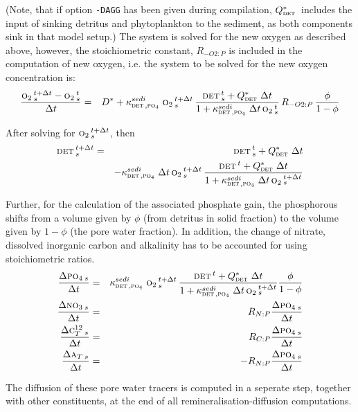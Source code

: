 \documentclass[11pt,a4paper,fleqn,twoside]{article}
\def\pho{\text{\textsc{po$_4$}}\,}
\def\nit{\text{\textsc{no$_3$}}\,}
\def\car{\text{\textsc{c$_T^{12}$}}\,}
\def\oxy{\text{\textsc{o$_2$}}\,}
\def\alk{\text{\textsc{a$_T$}}\,}
\def\det{\text{\textsc{det}}\,}
\begin{document}
 (Note, that if option {\tt -DAGG} has been given during compilation, $Q^*_\det$
includes the input of sinking detritus and phytoplankton to the sediment, as
both components sink in that model setup.)
The system is solved for the new oxygen as described above, however, 
the stoichiometric constant, $R_{-O2:P}$ is included in the computation of new
oxygen, i.e. the system to be solved for the new oxygen concentration is:
\begin{eqnarray}
\frac{\oxy^{t+\Delta t}_s-\oxy^{t}_s}{\Delta t} & = & 
D^* + \kappa^{sedi}_{\det,\pho} \, \oxy^{t+\Delta t}_s \, 
\frac{ \det^{t}_s + Q^*_\det \, \Delta t} {1+ \kappa^{sedi}_{\det,\pho} \,  \Delta t \,
\oxy^t_s } \, R_{-O2:P} \, \frac{\phi}{1-\phi} 
\end{eqnarray}

After solving for $\oxy^{t+\Delta t}_s$, then  
\begin{eqnarray}
\det^{t+\Delta t}_s & = & \det^t_s + Q^*_\det \, \Delta t \\
&& -\kappa^{sedi}_{\det,\pho} \, \Delta t \, \oxy^{t+\Delta t}_s \, 
\frac{ \det^{t} + Q^*_\det \, \Delta t} {1+ \kappa^{sedi}_{\det,\pho} \,  \Delta t \,
\oxy^{t + \Delta t}_s} \nonumber 
\end{eqnarray}


Further, for the calculation of the associated phosphate gain, the phosphorous
shifts from a volume given by $\phi$  (from detritus in solid fraction)
to the volume given by $1-\phi$ (the pore water fraction). In addition, the change of nitrate, dissolved inorganic carbon and alkalinity
has to be accounted for using stoichiometric ratios.
\begin{eqnarray}
\frac{\Delta \pho_s}{\Delta t} & = &  \kappa^{sedi}_{\det,\pho} \, \oxy^{t+\Delta t}_s \, 
\frac{ \det^{t} + Q^*_\det \, \Delta t} {1+ \kappa^{sedi}_{\det,\pho} \,  \Delta t \,
\oxy^{t + \Delta t}_s}\frac{\phi}{1-\phi}\label{dglpho}\\
\frac{\Delta \nit_s}{\Delta t} & = & R_{N:P} \frac{\Delta \pho_s} {\Delta t} \label{dglnit}\\
\frac{\Delta \car_s}{\Delta t} & = & R_{C:P} \frac{\Delta \pho_s} {\Delta t} \label{dglcar}\\
\frac{\Delta \alk_s}{\Delta t} & = & - R_{N:P} \frac{\Delta \pho_s} {\Delta t} \label{dglalk}
\end{eqnarray}

The diffusion of these pore water tracers is computed in a seperate step, together
with other constituents, at the end of all remineralisation-diffusion
computations.
\end{document}

